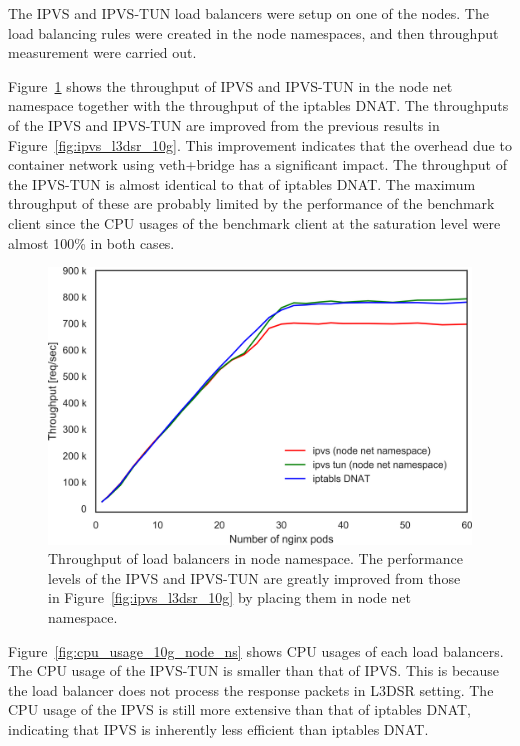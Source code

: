The IPVS and IPVS-TUN load balancers were setup on one of the nodes. 
The load balancing rules were created in the node namespaces, and then throughput measurement were carried out.

Figure~\ref{fig:ipvs_l3dsr_10g_node_ns} shows the throughput of IPVS and IPVS-TUN in the node net namespace together with the throughput of the iptables DNAT.
The throughputs of the IPVS and IPVS-TUN are improved from the previous results in Figure~\ref{fig:ipvs_l3dsr_10g}.
This improvement indicates that the overhead due to container network using veth+bridge has a significant impact.
%
The throughput of the IPVS-TUN is almost identical to that of iptables DNAT.
The maximum throughput of these are probably limited by the performance of the benchmark client since the CPU usages of the benchmark client at the saturation level were almost 100\% in both cases.

\begin{figure}[h]
  \centering
  \includegraphics[width=0.8\columnwidth]{Figs/ipvs_l3dsr_10g_node_ns}
  \par\bigskip
  \centering
  \begin{minipage}{0.9\columnwidth}
    \caption[Throughput of load balancers in node namespace]{
      Throughput of load balancers in node namespace.
      The performance levels of the IPVS and IPVS-TUN are greatly improved from those in Figure~\ref{fig:ipvs_l3dsr_10g} by placing them in node net namespace.
    }
    \label{fig:ipvs_l3dsr_10g_node_ns}
  \end{minipage}
\end{figure}

Figure~\ref{fig:cpu_usage_10g_node_ns} shows CPU usages of each load balancers.
The CPU usage of the IPVS-TUN is smaller than that of IPVS.
This is because the load balancer does not process the response packets in L3DSR setting.
The CPU usage of the IPVS is still more extensive than that of iptables DNAT, indicating that IPVS is inherently less efficient than iptables DNAT.

